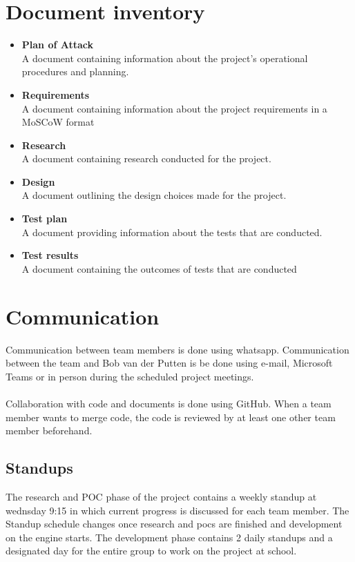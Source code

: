 \documentclass{article} %
\begin{document}
\section{Document inventory}
\begin{itemize}
    \item \textbf{Plan of Attack}
          \\
          A document containing information about the project's operational procedures and planning.
    \item \textbf{Requirements}
          \\
          A document containing information about the project requirements in a MoSCoW format
    \item \textbf{Research}
          \\
          A document containing research conducted for the project.
    \item \textbf {Design}
          \\
          A document outlining the design choices made for the project.
    \item \textbf {Test plan}
          \\
          A document providing information about the tests that are conducted.
    \item \textbf {Test results}
          \\
          A document containing the outcomes of tests that are conducted
\end{itemize}

\newpage

\section{Communication}
Communication between team members is done using whatsapp.
Communication between the team and Bob van der Putten
is be done using e-mail, Microsoft Teams or in person during the scheduled project meetings.
\\\\
Collaboration with code and documents is done using GitHub.
When a team member wants to merge code, the code is reviewed by at least one other team member beforehand.

\subsection{Standups}
The research and POC phase of the project contains a weekly standup at wednsday 9:15 in which current progress is discussed for each team member. The Standup schedule changes once research and pocs are finished and development on the engine starts. The development phase contains 2 daily standups and a designated day for the entire group to work on the project at school.
\end{document}
